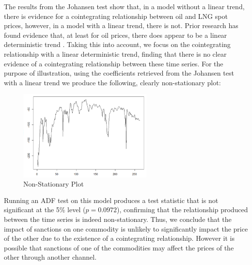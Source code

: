 The results from the Johansen test show that, in a model without a linear trend, there is evidence for a
cointegrating relationship between oil and LNG spot prices, however, in a model with a linear trend, there is
not. Prior research has found evidence that, at least for oil prices, there does appear to be a linear
deterministic trend \cite{matt2}. Taking this into account, we focus on the cointegrating
relationship with a linear deterministic trend, finding that there is no clear evidence of a cointegrating
relationship between these time series. For the purpose of illustration, using the coefficients retrieved from
the Johansen test with a linear trend we produce the following, clearly non-stationary plot:

\begin{figure}[H]
    \centering
    \includegraphics[width=0.6\textwidth]{Figures/Cointegration/non-stationary-plot.png}
    \caption{Non-Stationary Plot}
    \label{fig:Results_table}
\end{figure}

Running an ADF test on this model produces a test statistic that is not significant at the 5\% level ($p =
0.0972$), confirming that the relationship produced between the time series is indeed non-stationary.
Thus, we conclude that the impact of sanctions on one commodity is unlikely to significantly impact the
price of the other due to the existence of a cointegrating relationship. However it is possible that sanctions of one of
the commodities may affect the prices of the other through another channel.

